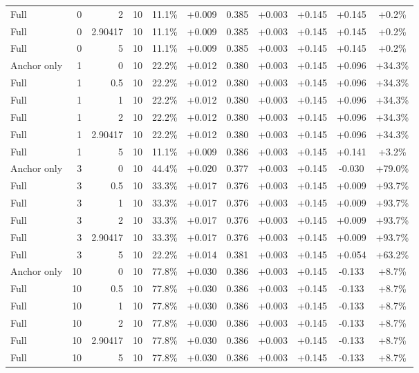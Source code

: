 \begin{table}[htbp]
\begin{tabular}{lrrrccccccc}
Full & 0 & 2 & 10 & 11.1\% & +0.009 & 0.385 & +0.003 & +0.145 & +0.145 & +0.2\% \\
Full & 0 & 2.90417 & 10 & 11.1\% & +0.009 & 0.385 & +0.003 & +0.145 & +0.145 & +0.2\% \\
Full & 0 & 5 & 10 & 11.1\% & +0.009 & 0.385 & +0.003 & +0.145 & +0.145 & +0.2\% \\
Anchor only & 1 & 0 & 10 & 22.2\% & +0.012 & 0.380 & +0.003 & +0.145 & +0.096 & +34.3\% \\
Full & 1 & 0.5 & 10 & 22.2\% & +0.012 & 0.380 & +0.003 & +0.145 & +0.096 & +34.3\% \\
Full & 1 & 1 & 10 & 22.2\% & +0.012 & 0.380 & +0.003 & +0.145 & +0.096 & +34.3\% \\
Full & 1 & 2 & 10 & 22.2\% & +0.012 & 0.380 & +0.003 & +0.145 & +0.096 & +34.3\% \\
Full & 1 & 2.90417 & 10 & 22.2\% & +0.012 & 0.380 & +0.003 & +0.145 & +0.096 & +34.3\% \\
Full & 1 & 5 & 10 & 11.1\% & +0.009 & 0.386 & +0.003 & +0.145 & +0.141 & +3.2\% \\
Anchor only & 3 & 0 & 10 & 44.4\% & +0.020 & 0.377 & +0.003 & +0.145 & -0.030 & +79.0\% \\
Full & 3 & 0.5 & 10 & 33.3\% & +0.017 & 0.376 & +0.003 & +0.145 & +0.009 & +93.7\% \\
Full & 3 & 1 & 10 & 33.3\% & +0.017 & 0.376 & +0.003 & +0.145 & +0.009 & +93.7\% \\
Full & 3 & 2 & 10 & 33.3\% & +0.017 & 0.376 & +0.003 & +0.145 & +0.009 & +93.7\% \\
Full & 3 & 2.90417 & 10 & 33.3\% & +0.017 & 0.376 & +0.003 & +0.145 & +0.009 & +93.7\% \\
Full & 3 & 5 & 10 & 22.2\% & +0.014 & 0.381 & +0.003 & +0.145 & +0.054 & +63.2\% \\
Anchor only & 10 & 0 & 10 & 77.8\% & +0.030 & 0.386 & +0.003 & +0.145 & -0.133 & +8.7\% \\
Full & 10 & 0.5 & 10 & 77.8\% & +0.030 & 0.386 & +0.003 & +0.145 & -0.133 & +8.7\% \\
Full & 10 & 1 & 10 & 77.8\% & +0.030 & 0.386 & +0.003 & +0.145 & -0.133 & +8.7\% \\
Full & 10 & 2 & 10 & 77.8\% & +0.030 & 0.386 & +0.003 & +0.145 & -0.133 & +8.7\% \\
Full & 10 & 2.90417 & 10 & 77.8\% & +0.030 & 0.386 & +0.003 & +0.145 & -0.133 & +8.7\% \\
Full & 10 & 5 & 10 & 77.8\% & +0.030 & 0.386 & +0.003 & +0.145 & -0.133 & +8.7\% \\

\end{tabular}
\end{table}
